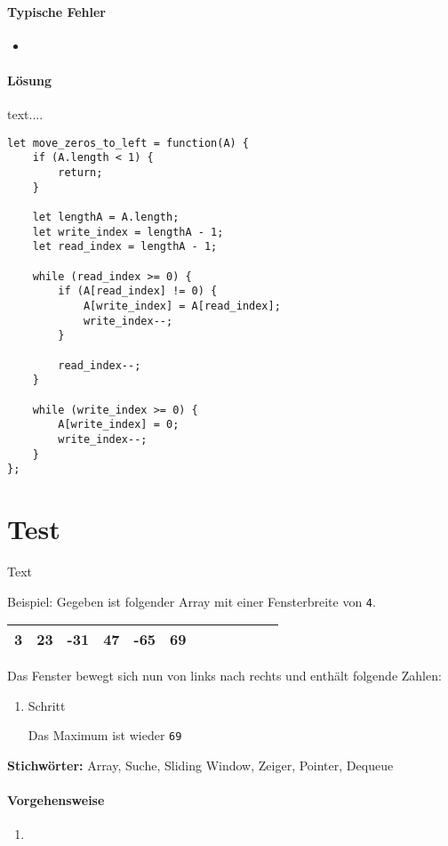 \documentclass{book}
\begin{document}
\paragraph{Typische Fehler}
\begin{itemize} 
	\item 	
\end{itemize}

\paragraph{Lösung}
text....

\begin{lstlisting}[caption=My Javascript Example]
let move_zeros_to_left = function(A) {
	if (A.length < 1) {
		return;
	}

	let lengthA = A.length;
	let write_index = lengthA - 1;
	let read_index = lengthA - 1;

	while (read_index >= 0) {
		if (A[read_index] != 0) {
			A[write_index] = A[read_index];
			write_index--;
		}
	
		read_index--;
	}

	while (write_index >= 0) {
		A[write_index] = 0;
		write_index--;
	}
};
\end{lstlisting}

\section{Test}
\begin{examplei}
	Text
	
	Beispiel:
	Gegeben ist folgender Array mit einer Fensterbreite von \lstinline|4|. 	
	
	\begin{tabular}{|l|l|l|l|l|l|l|l|l|l|l|l|} 
		\hline
		3 & 23 & -31 & 47 & -65 & 69 \\
		\hline
	\end{tabular}
	Das Fenster bewegt sich nun von links nach rechts und enthält folgende Zahlen:
	\begin{enumerate}
		\item Schritt	

		Das Maximum ist wieder \lstinline|69|
	\end{enumerate}
		
\end{examplei}
{\bf Stichwörter:} Array, Suche, Sliding Window, Zeiger, Pointer, Dequeue

\paragraph{Vorgehensweise}
\begin{enumerate} 
	\item 
\end{enumerate}
\end{document}
